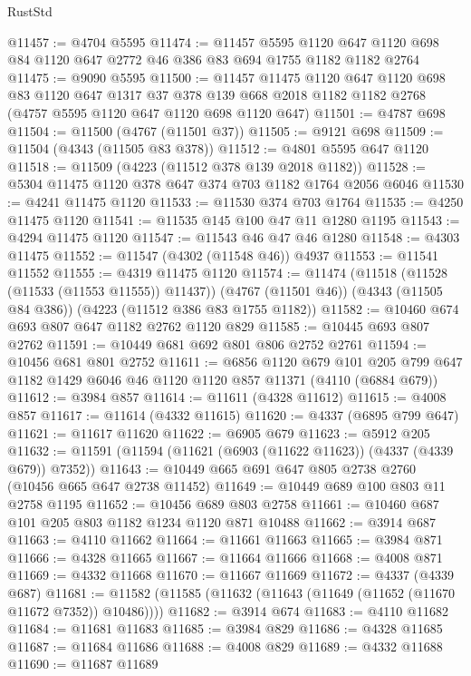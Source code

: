 \begin{lexlean}{RustStd}
\begin{coremodule}
@11457 := @4704 @5595
@11474 := @11457
    @5595
    @1120
    @647
    @1120
    @698
    @84
    @1120
    @647
    @2772
    @46
    @386
    @83
    @694
    @1755
    @1182
    @1182
    @2764
@11475 := @9090 @5595
@11500 := @11457
    @11475
    @1120
    @647
    @1120
    @698
    @83
    @1120
    @647
    @1317
    @37
    @378
    @139
    @668
    @2018
    @1182
    @1182
    @2768
    (@4757 @5595 @1120 @647 @1120 @698 @1120 @647)
@11501 := @4787 @698
@11504 := @11500 (@4767 (@11501 @37))
@11505 := @9121 @698
@11509 := @11504 (@4343 (@11505 @83 @378))
@11512 := @4801 @5595 @647 @1120
@11518 := @11509 (@4223 (@11512 @378 @139 @2018 @1182))
@11528 := @5304 @11475 @1120 @378 @647 @374 @703 @1182 @1764 @2056 @6046
@11530 := @4241 @11475 @1120
@11533 := @11530 @374 @703 @1764
@11535 := @4250 @11475 @1120
@11541 := @11535 @145 @100 @47 @11 @1280 @1195
@11543 := @4294 @11475 @1120
@11547 := @11543 @46 @47 @46 @1280
@11548 := @4303 @11475
@11552 := @11547 (@4302 (@11548 @46)) @4937
@11553 := @11541 @11552
@11555 := @4319 @11475 @1120
@11574 := @11474
    (@11518 (@11528 (@11533 (@11553 @11555)) @11437))
    (@4767 (@11501 @46))
    (@4343 (@11505 @84 @386))
    (@4223 (@11512 @386 @83 @1755 @1182))
@11582 := @10460 @674 @693 @807 @647 @1182 @2762 @1120 @829
@11585 := @10445 @693 @807 @2762
@11591 := @10449 @681 @692 @801 @806 @2752 @2761
@11594 := @10456 @681 @801 @2752
@11611 := @6856
    @1120
    @679
    @101
    @205
    @799
    @647
    @1182
    @1429
    @6046
    @46
    @1120
    @1120
    @857
    @11371
    (@4110 (@6884 @679))
@11612 := @3984 @857
@11614 := @11611 (@4328 @11612)
@11615 := @4008 @857
@11617 := @11614 (@4332 @11615)
@11620 := @4337 (@6895 @799 @647)
@11621 := @11617 @11620
@11622 := @6905 @679
@11623 := @5912 @205
@11632 := @11591 (@11594 (@11621 (@6903 (@11622 @11623)) (@4337 (@4339 @679)) @7352))
@11643 := @10449 @665 @691 @647 @805 @2738 @2760 (@10456 @665 @647 @2738 @11452)
@11649 := @10449 @689 @100 @803 @11 @2758 @1195
@11652 := @10456 @689 @803 @2758
@11661 := @10460 @687 @101 @205 @803 @1182 @1234 @1120 @871 @10488
@11662 := @3914 @687
@11663 := @4110 @11662
@11664 := @11661 @11663
@11665 := @3984 @871
@11666 := @4328 @11665
@11667 := @11664 @11666
@11668 := @4008 @871
@11669 := @4332 @11668
@11670 := @11667 @11669
@11672 := @4337 (@4339 @687)
@11681 := @11582 (@11585 (@11632 (@11643 (@11649 (@11652 (@11670 @11672 @7352)) @10486))))
@11682 := @3914 @674
@11683 := @4110 @11682
@11684 := @11681 @11683
@11685 := @3984 @829
@11686 := @4328 @11685
@11687 := @11684 @11686
@11688 := @4008 @829
@11689 := @4332 @11688
@11690 := @11687 @11689

\end{coremodule}
\end{lexlean}

